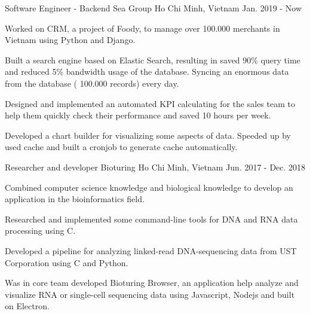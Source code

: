 

\begin{cventries}

  \cventry
    {Software Engineer - Backend} %
    {Sea Group} %
    {Ho Chi Minh, Vietnam} %
    {Jan. 2019 - Now} %
    {
      \begin{cvitems} %
        \item {Worked on CRM, a project of Foody, to manage over 100.000 merchants in Vietnam using Python and Django.}
        \item {Built a search engine based on Elastic Search, resulting in saved 90\% query time and reduced 5\% bandwidth usage of the database. Syncing an enormous data from the database ( 100.000 records) every day.}
        \item {Designed and implemented an automated KPI calculating for the sales team to help them quickly check their performance and saved 10 hours per week.}
        \item {Developed a chart builder for visualizing some aspects of data. Speeded up by used cache and built a cronjob to generate cache automatically.}
      \end{cvitems}
    }

  \cventry
    {Researcher and developer} %
    {Bioturing} %
    {Ho Chi Minh, Vietnam} %
    {Jun. 2017 - Dec. 2018} %
    {
      \begin{cvitems} %
        \item {Combined computer science knowledge and biological knowledge to develop an application in the bioinformatics field.}
        \item {Researched and implemented some command-line tools for DNA and RNA data processing using C.}
        \item {Developed a pipeline for analyzing linked-read DNA-sequencing data from UST Corporation using C and Python.}
        \item {Was in core team developed Bioturing Browser, an application help analyze and visualize RNA or single-cell sequencing data using Javascript, Nodejs and built on Electron.}
      \end{cvitems}
    }


\end{cventries}
